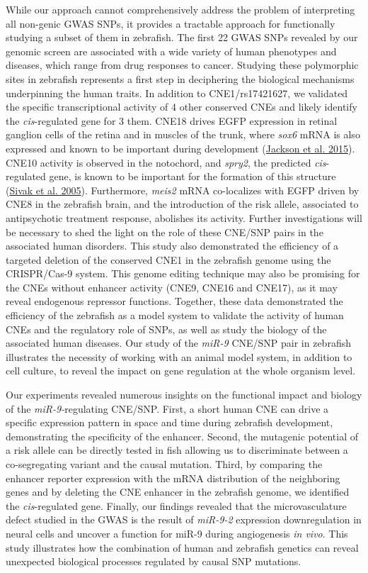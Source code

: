 \documentclass[]{article}
\begin{document}
While our approach cannot comprehensively address the problem of
interpreting all non-genic GWAS SNPs, it provides a tractable approach
for functionally studying a subset of them in zebrafish. The first 22
GWAS SNPs revealed by our genomic screen are associated with a wide
variety of human phenotypes and diseases, which range from drug
responses to cancer. Studying these polymorphic sites in zebrafish
represents a first step in deciphering the biological mechanisms
underpinning the human traits. In addition to CNE1/rs17421627, we
validated the specific transcriptional activity of 4 other conserved
CNEs and likely identify the \emph{cis}-regulated gene for 3 them. CNE18
drives EGFP expression in retinal ganglion cells of the retina and in
muscles of the trunk, where \emph{sox6} mRNA is also expressed and known
to be important during development
(\protect\hyperlink{_ENREF_10}{Jackson et al. 2015}). CNE10 activity is
observed in the notochord, and \emph{spry2}, the predicted
\emph{cis}-regulated gene, is known to be important for the formation of
this structure (\protect\hyperlink{_ENREF_30}{Sivak et al. 2005}).
Furthermore, \emph{meis2} mRNA co-localizes with EGFP driven by CNE8 in
the zebrafish brain, and the introduction of the risk allele, associated
to antipsychotic treatment response, abolishes its activity. Further
investigations will be necessary to shed the light on the role of these
CNE/SNP pairs in the associated human disorders. This study also
demonstrated the efficiency of a targeted deletion of the conserved CNE1
in the zebrafish genome using the CRISPR/Cas-9 system. This genome
editing technique may also be promising for the CNEs without enhancer
activity (CNE9, CNE16 and CNE17), as it may reveal endogenous repressor
functions. Together, these data demonstrated the efficiency of the
zebrafish as a model system to validate the activity of human CNEs and
the regulatory role of SNPs, as well as study the biology of the
associated human diseases. Our study of the \emph{miR-9} CNE/SNP pair in
zebrafish illustrates the necessity of working with an animal model
system, in addition to cell culture, to reveal the impact on gene
regulation at the whole organism level.

Our experiments revealed numerous insights on the functional impact and
biology of the \emph{miR-9-}regulating CNE/SNP. First, a short human CNE
can drive a specific expression pattern in space and time during
zebrafish development, demonstrating the specificity of the enhancer.
Second, the mutagenic potential of a risk allele can be directly tested
in fish allowing us to discriminate between a co-segregating variant and
the causal mutation. Third, by comparing the enhancer reporter
expression with the mRNA distribution of the neighboring genes and by
deleting the CNE enhancer in the zebrafish genome, we identified the
\emph{cis}-regulated gene. Finally, our findings revealed that the
microvasculature defect studied in the GWAS is the result of
\emph{miR-9-2} expression downregulation in neural cells and uncover a
function for miR-9 during angiogenesis \emph{in vivo}. This study
illustrates how the combination of human and zebrafish genetics can
reveal unexpected biological processes regulated by causal SNP
mutations.
\end{document}
